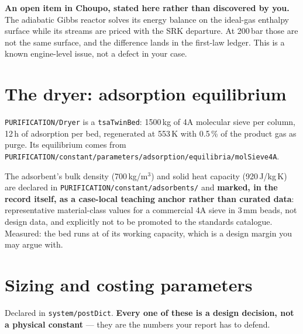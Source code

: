 \documentclass[11pt,a4paper]{article}
\begin{document}
\begin{caveat}
\textbf{An open item in Choupo, stated here rather than discovered by you.}
The adiabatic Gibbs reactor solves its energy balance on the ideal-gas
enthalpy surface while its streams are priced with the SRK departure. At
200\,bar those are not the same surface, and the difference lands in the
first-law ledger. This is a known engine-level issue, not a defect in your
case.
\end{caveat}

\section{The dryer: adsorption equilibrium}

\texttt{PURIFICATION/Dryer} is a \texttt{tsaTwinBed}: 1500\,kg of 4A molecular
sieve per column, 12\,h of adsorption per bed, regenerated at 553\,K with
0.5\,\% of the product gas as purge. Its equilibrium comes from
\texttt{PURIFICATION/constant/parameters/adsorption/equilibria/molSieve4A}.

The adsorbent's bulk density (700\,kg/m$^3$) and solid heat capacity
(920\,J/kg\,K) are declared in \texttt{PURIFICATION/constant/adsorbents/} and
\textbf{marked, in the record itself, as a case-local teaching anchor rather
than curated data}: representative material-class values for a commercial 4A
sieve in 3\,mm beads, not design data, and explicitly not to be promoted to the
standards catalogue. Measured: the bed runs at  of its
working capacity, which is a design margin you may argue with.

\section{Sizing and costing parameters}

Declared in \texttt{system/postDict}. \textbf{Every one of these is a design
decision, not a physical constant} --- they are the numbers your report has to
defend.
\end{document}
